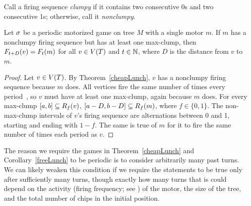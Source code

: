 Call a firing sequence \emph{clumpy} if it contains two consecutive 0s and two
consecutive 1s; otherwise, call it \emph{nonclumpy}.

\begin{cor} \label{freeLunch}
Let $\s$ be a periodic motorized game on tree $M$ with a single motor $m$. If
$m$ has a nonclumpy firing sequence but has at least one max-clump, then
$\firing{v}{t+D} = \firing{m}{t}$ for all $v \in \V[T]$ and $t \in \nats$,
where $D$ is the distance from $v$ to $m$.
\end{cor}

\begin{proof}
Let $v \in \V[T]$. By Theorem~\ref{cheapLunch}, $v$ has a nonclumpy firing
sequence because $m$ does. All vertices fire the same number of times every
period~\cite[Proposition~2.5]{jiang}, so $v$ must have at least one max-clump,
again because $m$ does. For every max-clump $[a, b] \subseteq \pat{v}{f}$,
$[a-D, b-D] \subseteq \pat{m}{f}$, where $f \in \{0,1\}$. The non-max-clump
intervals of $v$'s firing sequence are alternations between 0 and 1, starting
and ending with $1-f$. The same is true of $m$ for it to fire the same number
of times each period as $v$.
\end{proof}

The reason we require the games in Theorem~\ref{cheapLunch} and
Corollary~\ref{freeLunch} to be periodic is to consider arbitrarily many past
turns. We can likely weaken this condition if we require the statements to be
true only after sufficiently many turns, though exactly how many turns that is
could depend on the activity (firing frequency; see \cite{levine}) of the
motor, the size of the tree, and the total number of chips in the initial
position.
